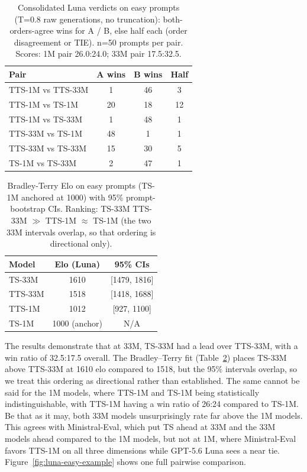 \documentclass{article}
\newif\ifmarkup
\DeclareRobustCommand{\ins}[1]{\ifmarkup\textbf{#1}\else#1\fi}
\DeclareRobustCommand{\del}[1]{\ifmarkup\sout{#1}\fi}
\begin{document}
\begin{table}[H]
  \centering
  \small
  \begin{tabular}{@{}lccc@{}}
    \toprule
    Pair & A wins & B wins & Half \\
    \midrule
    TTS-1M vs TTS-33M & 1 & 46 & 3 \\
    TTS-1M vs TS-1M & 20 & 18 & 12 \\
    TTS-1M vs TS-33M & 1 & 48 & 1 \\
    TTS-33M vs TS-1M & 48 & 1 & 1 \\
    TTS-33M vs TS-33M & 15 & 30 & 5 \\
    TS-1M vs TS-33M & 2 & 47 & 1 \\
    \bottomrule
  \end{tabular}
  \caption{Consolidated Luna verdicts on easy prompts (T=0.8 raw generations, no truncation):
  both-orders-agree wins for A / B, else half each (order disagreement or TIE).
  n=50 prompts per pair. Scores: 1M pair 26.0:24.0; 33M pair 17.5:32.5.}
  \label{tab:easy-cons}
\end{table}

\begin{table}[H]
  \centering
  \small
  \begin{tabular}{@{}lcc@{}}
    \toprule
    Model & Elo (Luna) & 95\% CIs \\
    \midrule
    TS-33M & 1610 & [1479, 1816] \\
    TTS-33M & 1518 & [1418, 1688] \\
    TTS-1M & 1012 & [927, 1100] \\
    TS-1M & 1000 (anchor) & N/A \\
    \bottomrule
  \end{tabular}
  \caption{Bradley-Terry Elo on easy prompts (TS-1M anchored at 1000) with 95\%
  prompt-bootstrap CIs.
  Ranking: TS-33M \del{$>$}\ins{$\gtrsim$} TTS-33M $\gg$ TTS-1M $\approx$ TS-1M\ins{ (the two 33M intervals overlap, so that ordering is directional only)}.}
  \label{tab:elo}
\end{table}

The results demonstrate that at 33M, TS-33M had a lead over TTS-33M, with a win ratio of 32.5:17.5 overall. The Bradley--Terry fit (Table~\ref{tab:elo}) places TS-33M above TTS-33M at 1610 elo compared to 1518, but the 95\% intervals overlap, so we treat this ordering as directional rather than established. The same cannot be said for the 1M models, where TTS-1M and TS-1M being statistically indistinguishable, with TTS-1M having a win ratio of 26:24 compared to TS-1M. Be that as it may, both 33M models unsurprisingly rate far above the 1M models. This agrees with Ministral-Eval, which put TS ahead at 33M and the 33M models ahead compared to the 1M models, but not at 1M, where Ministral-Eval favors TTS-1M on all three dimensions while GPT-5.6 Luna sees a near tie. Figure~\ref{fig:luna-easy-example} shows one full pairwise comparison.
\end{document}
